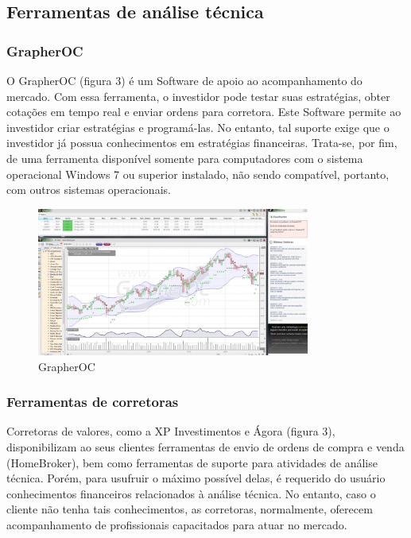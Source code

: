 \subsection{Ferramentas de análise técnica}

\subsubsection{GrapherOC}

O GrapherOC (figura 3) é um Software de apoio ao acompanhamento do mercado. Com essa ferramenta, o investidor pode testar suas estratégias, obter cotações em tempo real e enviar ordens para corretora. Este Software permite ao investidor criar estratégias e programá-las. No entanto, tal suporte exige que o investidor já possua conhecimentos em estratégias financeiras. Trata-se, por fim, de uma ferramenta disponível somente para computadores com o sistema operacional Windows 7 \textregistered   ou superior instalado, não sendo compatível, portanto, com outros sistemas operacionais.


\begin{figure}[h]
\centering
\label{f03}
\includegraphics[width=0.8\textwidth]{figuras/f03}
\caption{GrapherOC}

\end{figure}

\subsubsection{Ferramentas de corretoras}

Corretoras de valores, como a XP Investimentos e Ágora (figura 3), disponibilizam ao seus clientes ferramentas de envio de ordens de compra e venda (HomeBroker), bem como ferramentas de suporte para atividades de análise técnica. Porém, para usufruir o máximo possível delas, é requerido do usuário conhecimentos financeiros relacionados à análise técnica. No entanto, caso o cliente não tenha tais conhecimentos, as corretoras, normalmente, oferecem acompanhamento de profissionais capacitados para atuar no mercado.

